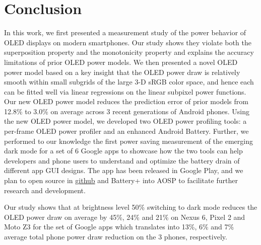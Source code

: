 \section{Conclusion}
\label{sec:conc}

In this work, we first presented a measurement study of the power behavior
of OLED displays on modern smartphones.
Our study shows they violate both the
superposition property and the monotonicity property and explains the
accuracy limitations of prior OLED power models. We then presented a
novel OLED power model based on a key
insight that the OLED power draw is relatively smooth within small
subgrids of the large 3-D sRGB color space, and hence each can be fitted
well via linear regressions on the linear subpixel power functions.
Our new OLED power model reduces the prediction error of prior models
from 12.8\% to 3.0\% on average across 3 recent generations of Android
phones.
Using the new OLED power model, we developed two OLED power
profiling tools: a per-frame OLED power profiler and an enhanced Android Battery.
%
Further, we performed to our knowledge the first power saving
measurement of the emerging dark mode for a set of 6 Google
apps to showcase how the two tools can help developers
and phone users to understand and optimize the battery drain of
different app GUI designs.
The \appwithlink app
has been released in Google Play, and
we
plan to open source \name in \url{github} and Battery+ into AOSP
to facilitate further research and development.



Our study shows that at brightness level 50\%
switching to dark mode reduces the OLED
power draw on average by 45\%, 24\% and 21\% on Nexus 6,
Pixel 2 and Moto Z3 for the set of
Google apps which translates into 13\%, 6\% and 7\%
average total phone power draw reduction on the 3 phones, respectively.
\fi
